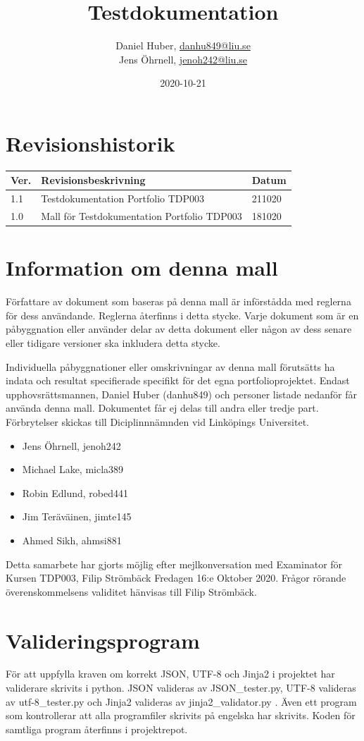 \documentclass{TDP003mall}
\author{Daniel Huber, \url{danhu849@liu.se}\\
  Jens Öhrnell, \url{jenoh242@liu.se}}
\title{Testdokumentation}
\date{2020-10-21}
\begin{document}
\projectpage
\tableofcontents
\section{Revisionshistorik}
\begin{table}[!h]
\begin{tabularx}{\linewidth}{|l|X|l|}
\hline
Ver. & Revisionsbeskrivning & Datum \\\hline
1.1 & Testdokumentation Portfolio TDP003 & 211020 \\\hline
1.0 & Mall för Testdokumentation Portfolio TDP003 & 181020 \\\hline
\end{tabularx}
\end{table}

\section{Information om denna mall}
Författare av dokument som baseras på denna mall är införstådda med reglerna för dess användande. Reglerna återfinns i detta stycke. Varje dokument som är en påbyggnation eller använder delar av detta dokument eller någon av dess senare eller tidigare versioner ska inkludera detta stycke.

Individuella påbyggnationer eller omskrivningar av denna mall förutsätts ha indata och resultat specifierade specifikt för det egna portfolioprojektet. Endast upphovsrättsmannen, Daniel Huber (danhu849) och personer listade nedanför får använda denna mall. Dokumentet får ej delas till andra eller tredje part. Förbrytelser skickas till Diciplinnnämnden vid Linköpings Universitet.
\begin{itemize}
\item Jens Öhrnell, jenoh242
\item Michael Lake, micla389
\item Robin Edlund, robed441
\item Jim Teräväinen, jimte145
\item Ahmed Sikh, ahmsi881
\end{itemize}

Detta samarbete har gjorts möjlig efter mejlkonversation med Examinator för Kursen TDP003, Filip Strömbäck Fredagen 16:e Oktober 2020. Frågor rörande överenskommelsens validitet hänvisas till Filip Strömbäck.

\section{Valideringsprogram}
För att uppfylla kraven om korrekt JSON, UTF-8 och Jinja2 i projektet har validerare skrivits i python. JSON valideras av JSON\_tester.py, UTF-8 valideras av utf-8\_tester.py och Jinja2 valideras av jinja2\_validator.py . Även ett program som kontrollerar att alla programfiler skrivits på engelska har skrivits. Koden för samtliga program återfinns i projektrepot.  
\end{document}
